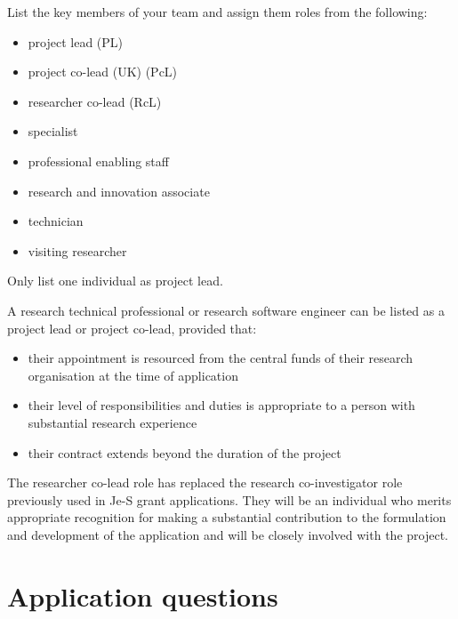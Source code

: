 \documentclass[12in]{article}
\begin{document}
{\color{red}

List the key members of your team and assign them roles from the following:

\begin{itemize}
	\item project lead (PL)
	\item project co-lead (UK) (PcL)
	\item researcher co-lead (RcL)
	\item specialist
	\item professional enabling staff
	\item research and innovation associate
	\item technician
	\item visiting researcher
\end{itemize}

Only list one individual as project lead.

A research technical professional or research software engineer can be listed
as a project lead or project co-lead, provided that:

\begin{itemize}

	\item their appointment is resourced from the central funds of their research
organisation at the time of application

	\item their level of responsibilities and duties is appropriate to a person with
substantial research experience

	\item their contract extends beyond the duration of the project

\end{itemize}

The researcher co-lead role has replaced the research co-investigator role
previously used in Je-S grant applications. They will be an individual who merits
appropriate recognition for making a substantial contribution to the formulation
and development of the application and will be closely involved with the project.

}



\pagebreak

\section{Application questions}
\end{document}
